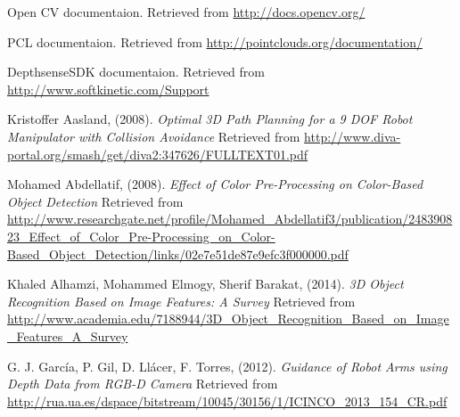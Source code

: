 \begin{thebibliography}{99}

	Open CV documentaion.
	Retrieved from \url{http://docs.opencv.org/}

	PCL documentaion.
	Retrieved from \url{http://pointclouds.org/documentation/}
	
	DepthsenseSDK documentaion.
	Retrieved from \url{http://www.softkinetic.com/Support}
	
	Kristoffer Aasland,
	(2008).
	\emph{Optimal 3D Path Planning for a 9 DOF
	Robot Manipulator with Collision
	Avoidance}
	Retrieved from
	\url{http://www.diva-portal.org/smash/get/diva2:347626/FULLTEXT01.pdf}
	
	Mohamed Abdellatif,
	(2008).
	\emph{Effect of Color Pre-Processing on Color-Based Object Detection}
	Retrieved from
	\url{http://www.researchgate.net/profile/Mohamed_Abdellatif3/publication/248390823_Effect_of_Color_Pre-Processing_on_Color-Based_Object_Detection/links/02e7e51de87e9efc3f000000.pdf}
	
	Khaled Alhamzi, Mohammed Elmogy, Sherif Barakat,
	(2014).
	\emph{3D Object Recognition Based on Image Features: A Survey}
	Retrieved from
	\url{http://www.academia.edu/7188944/3D_Object_Recognition_Based_on_Image_Features_A_Survey}
	
	G. J. García, P. Gil, D. Llácer, F. Torres,
	(2012).
	\emph{Guidance of Robot Arms using Depth Data from RGB-D Camera}
	Retrieved from
	\url{http://rua.ua.es/dspace/bitstream/10045/30156/1/ICINCO_2013_154_CR.pdf}	
\end{thebibliography}